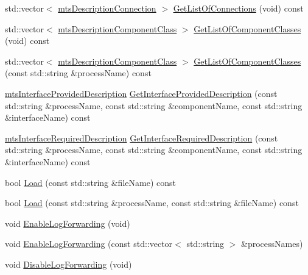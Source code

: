 \begin{DoxyCompactItemize}
\item 
std\+::vector$<$ \hyperlink{classmts_description_connection}{mts\+Description\+Connection} $>$ \hyperlink{classmts_manager_component_services_a758b2e80128800532561668d67ad1a1d}{Get\+List\+Of\+Connections} (void) const 
\item 
std\+::vector$<$ \hyperlink{classmts_description_component_class}{mts\+Description\+Component\+Class} $>$ \hyperlink{classmts_manager_component_services_a1ec4b1157dfab6f371d7247a1c736dc5}{Get\+List\+Of\+Component\+Classes} (void) const 
\item 
std\+::vector$<$ \hyperlink{classmts_description_component_class}{mts\+Description\+Component\+Class} $>$ \hyperlink{classmts_manager_component_services_a50b91497aea42ceed34ce0366b33544b}{Get\+List\+Of\+Component\+Classes} (const std\+::string \&process\+Name) const 
\item 
\hyperlink{classmts_interface_provided_description}{mts\+Interface\+Provided\+Description} \hyperlink{classmts_manager_component_services_af3e386364e4724619500f756aee841d3}{Get\+Interface\+Provided\+Description} (const std\+::string \&process\+Name, const std\+::string \&component\+Name, const std\+::string \&interface\+Name) const 
\item 
\hyperlink{classmts_interface_required_description}{mts\+Interface\+Required\+Description} \hyperlink{classmts_manager_component_services_a2a886ede498b63f0b9e7feebc61515a3}{Get\+Interface\+Required\+Description} (const std\+::string \&process\+Name, const std\+::string \&component\+Name, const std\+::string \&interface\+Name) const 
\item 
bool \hyperlink{classmts_manager_component_services_a3bd5a6fb204dc6634492a017826ac4d6}{Load} (const std\+::string \&file\+Name) const 
\item 
bool \hyperlink{classmts_manager_component_services_a810f37fd41bfa13aed6d529fc796c7ac}{Load} (const std\+::string \&process\+Name, const std\+::string \&file\+Name) const 
\item 
void \hyperlink{classmts_manager_component_services_a87f252282b2fca758264f3969fbc387a}{Enable\+Log\+Forwarding} (void)
\item 
void \hyperlink{classmts_manager_component_services_a53e074ce13e3a76f307307760b24d204}{Enable\+Log\+Forwarding} (const std\+::vector$<$ std\+::string $>$ \&process\+Names)
\item 
void \hyperlink{classmts_manager_component_services_aab3395d819330f83b23e7d92b3e5c3ed}{Disable\+Log\+Forwarding} (void)
\item 

\end{DoxyCompactItemize}
